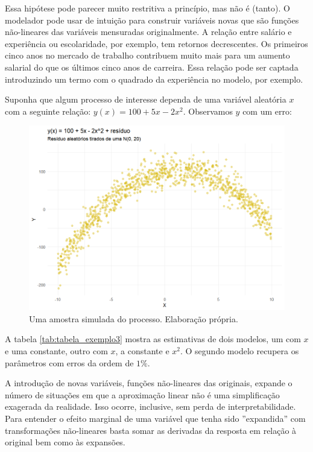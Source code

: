 Essa hipótese pode parecer muito restritiva a princípio, mas não é (tanto). O modelador pode usar de intuição para construir variáveis novas que são funções não-lineares das variáveis mensuradas originalmente. A relação entre salário e experiência ou escolaridade, por exemplo, tem retornos decrescentes. Os primeiros cinco anos no mercado de trabalho contribuem muito mais para um aumento salarial do que os últimos cinco anos de carreira. Essa relação pode ser captada introduzindo um termo com o quadrado da experiência no modelo, por exemplo. 

\begin{exemplo}

Suponha que algum processo de interesse dependa de uma variável aleatória $x$ com a seguinte relação: $y(x) = 100 + 5x - 2x^2$. Observamos $y$ com um erro:

\begin{figure}[H]
    \centering
    \includegraphics[scale = .75]{imagens/exemplo3_dist.png}
    \caption{Uma amostra simulada do processo. Elaboração própria.}
\end{figure}

A tabela \ref{tab:tabela_exemplo3} mostra as estimativas de dois modelos, um com $x$ e uma constante, outro com $x$, a constante e $x^2$. O segundo modelo recupera os parâmetros com erros da ordem de $1\%$. 

\label{tab:tabela_exemplo3}

A introdução de novas variáveis, funções não-lineares das originais, expande o número de situações em que a aproximação linear não é uma simplificação exagerada da realidade. Isso ocorre, inclusive, sem perda de interpretabilidade. Para entender o efeito marginal de uma variável que tenha sido ''expandida'' com transformações não-lineares basta somar as derivadas da resposta em relação à original bem como às expansões.


\end{exemplo}

